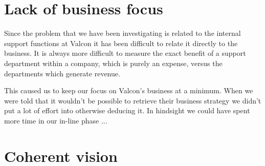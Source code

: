 \section*{Lack of business focus}
Since the problem that we have been investigating is related to the internal support functions at Valcon it has been difficult to relate it directly to the business.
It is always more difficult to measure the exact benefit of a support department within a company, which is purely an expense, versus the departments which generate revenue.

This caused us to keep our focus on Valcon's business at a minimum.
When we were told that it wouldn't be possible to retrieve their business strategy we didn't put a lot of effort into otherwise deducing it.
In hindsight we could have spent more time in our in-line phase ...

\section*{Coherent vision}